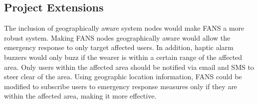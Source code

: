 \subsection{Project Extensions}

The inclusion of geographically aware system nodes would make FANS a more robust system. Making FANS nodes
geographically aware would allow the emergency response to only target affected users. In addition, haptic alarm
buzzers would only buzz if the wearer is within a certain range of the affected area. Only users within the affected
area should be notified via email and SMS to steer clear of the area. Using geographic location information, FANS could
be modified to subscribe users to emergency response measures only if they are within the affected area, making it more
effective.
